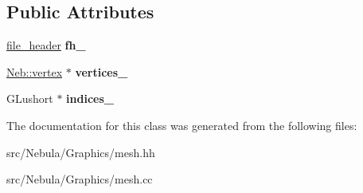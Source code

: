 \subsection*{\-Public \-Attributes}
\begin{DoxyCompactItemize}
\item 
\hypertarget{classNeb_1_1mesh_ac14d8e128fa08a0af6ee94ac8ead51fe}{\hyperlink{structNeb_1_1file__header}{file\-\_\-header} {\bfseries fh\-\_\-}}\label{classNeb_1_1mesh_ac14d8e128fa08a0af6ee94ac8ead51fe}

\item 
\hypertarget{classNeb_1_1mesh_aefde5a8aa00acae79b9200a6586b5516}{\hyperlink{structNeb_1_1vertex}{\-Neb\-::vertex} $\ast$ {\bfseries vertices\-\_\-}}\label{classNeb_1_1mesh_aefde5a8aa00acae79b9200a6586b5516}

\item 
\hypertarget{classNeb_1_1mesh_a797d7464a3d8c5735ed41e244e1de533}{\-G\-Lushort $\ast$ {\bfseries indices\-\_\-}}\label{classNeb_1_1mesh_a797d7464a3d8c5735ed41e244e1de533}

\end{DoxyCompactItemize}


\-The documentation for this class was generated from the following files\-:\begin{DoxyCompactItemize}
\item 
src/\-Nebula/\-Graphics/mesh.\-hh\item 
src/\-Nebula/\-Graphics/mesh.\-cc\end{DoxyCompactItemize}
